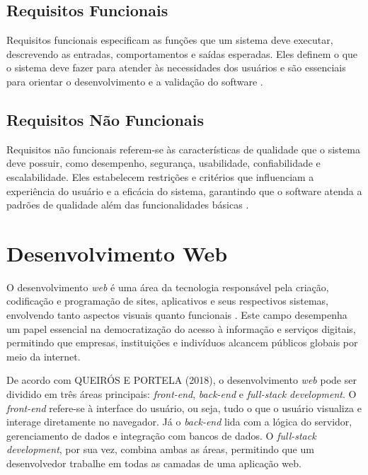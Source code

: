 {%

\subsection{Requisitos Funcionais}
Requisitos funcionais especificam as funções que um sistema deve executar, descrevendo as entradas, comportamentos e saídas esperadas. Eles definem o que o sistema deve fazer para atender às necessidades dos usuários e são essenciais para orientar o desenvolvimento e a validação do software \citep{pressman2021engenharia}.

\subsection{Requisitos Não Funcionais}
Requisitos não funcionais referem-se às características de qualidade que o sistema deve possuir, como desempenho, segurança, usabilidade, confiabilidade e escalabilidade. Eles estabelecem restrições e critérios que influenciam a experiência do usuário e a eficácia do sistema, garantindo que o software atenda a padrões de qualidade além das funcionalidades básicas \citep{pressman2021engenharia}.

\section{Desenvolvimento Web}

O desenvolvimento \textit{web} é uma área da tecnologia responsável pela criação, codificação e programação de sites, aplicativos e seus respectivos sistemas, envolvendo tanto aspectos visuais quanto funcionais \citep{queirosintrodução}. Este campo desempenha um papel essencial na democratização do acesso à informação e serviços digitais, permitindo que empresas, instituições e indivíduos alcancem públicos globais por meio da internet.

De acordo com QUEIRÓS E PORTELA (2018), o desenvolvimento \textit{web} pode ser dividido em três áreas principais: \textit{front-end}, \textit{back-end} e \textit{full-stack development}. O \textit{front-end} refere-se à interface do usuário, ou seja, tudo o que o usuário visualiza e interage diretamente no navegador. Já o \textit{back-end} lida com a lógica do servidor, gerenciamento de dados e integração com bancos de dados. O \textit{full-stack development}, por sua vez, combina ambas as áreas, permitindo que um desenvolvedor trabalhe em todas as camadas de uma aplicação web.

}
